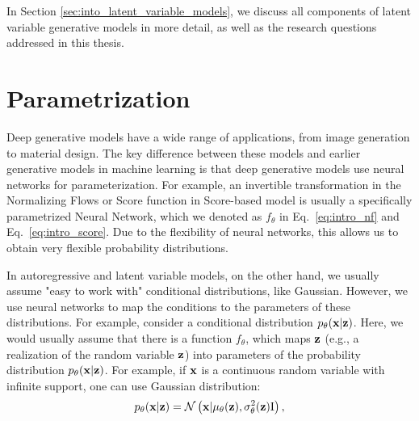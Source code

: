 In Section \ref{sec:into_latent_variable_models}, we discuss all components of latent variable generative models in more detail, as well as the research questions addressed in this thesis.




\section{Parametrization}\label{sec:intro_parametrization}
Deep generative models have a wide range of applications, from image generation to material design. The key difference between these models and earlier generative models in machine learning is that deep generative models use neural networks for parameterization. 
For example, an invertible transformation in the Normalizing Flows or Score function in Score-based model is usually a specifically parametrized Neural Network, which we denoted as $f_{\theta}$ in Eq.~\ref{eq:intro_nf} and Eq.~\ref{eq:intro_score}. Due to the flexibility of neural networks, this allows us to obtain very flexible probability distributions. 

In autoregressive and latent variable models, on the other hand, we usually assume "easy to work with" conditional distributions, like Gaussian. However, we use neural networks to map the conditions to the parameters of these distributions. 
For example, consider a conditional distribution $p_{\theta}({\mathbf{x}}|{\mathbf{z}})$. Here, we would usually assume that there is a function $f_{\theta}$, which maps ${\mathbf{z}}$ (e.g., a realization of the random variable ${\mathbf{z}}$) into parameters of the probability distribution $p_{\theta}({\mathbf{x}}|{\mathbf{z}})$. For example, if ${\mathbf{x}}$ is a continuous random variable with infinite support, one can use Gaussian distribution:
\begin{equation}
    p_{\theta}({\mathbf{x}}|{\mathbf{z}}) = \mathcal{N}\left({\mathbf{x}}| \mu_{\theta}({\mathbf{z}}), \sigma^2_{\theta}({\mathbf{z}}) \text{I}\right),
\end{equation}

